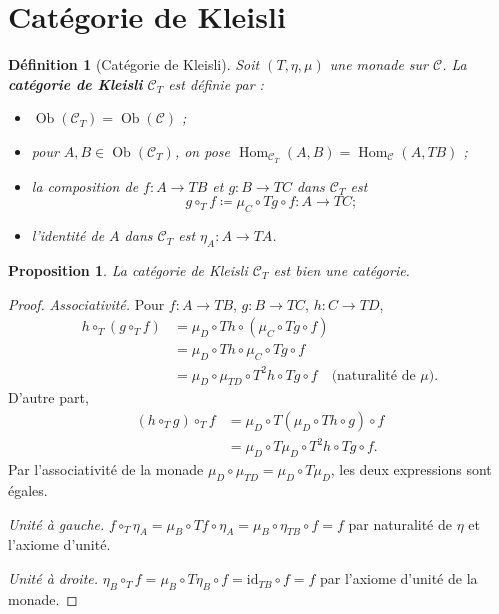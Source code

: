 \documentclass[a4paper,12pt]{book}
\DeclareMathOperator{\Hom}{Hom}
\DeclareMathOperator{\Ob}{Ob}
\newcommand{\id}{\mathrm{id}}
\newtheorem{proposition}[theoreme]{Proposition}
\newtheorem{definition}[theoreme]{Définition}
\begin{document}
\section{Catégorie de Kleisli}\label{sec:kleisli}

\begin{definition}[Catégorie de Kleisli]\label{def:categorie-kleisli}
Soit $(T, \eta, \mu)$ une monade sur $\mathcal{C}$.
La \textbf{catégorie de Kleisli} $\mathcal{C}_T$ est définie par :
\begin{itemize}
    \item $\Ob(\mathcal{C}_T) = \Ob(\mathcal{C})$ ;
    \item pour $A, B \in \Ob(\mathcal{C}_T)$, on pose
    $\Hom_{\mathcal{C}_T}(A, B) = \Hom_{\mathcal{C}}(A, TB)$ ;
    \item la composition de $f \colon A \to TB$ et $g \colon B \to TC$
    dans $\mathcal{C}_T$ est
    \[
        g \circ_T f \coloneqq \mu_C \circ Tg \circ f \colon A \to TC ;
    \]
    \item l'identité de $A$ dans $\mathcal{C}_T$ est $\eta_A \colon A \to TA$.
\end{itemize}
\end{definition}

\begin{proposition}\label{prop:kleisli-categorie}
La catégorie de Kleisli $\mathcal{C}_T$ est bien une catégorie.
\end{proposition}

\begin{proof}
\emph{Associativité.}
Pour $f \colon A \to TB$, $g \colon B \to TC$, $h \colon C \to TD$,
\begin{align*}
    h \circ_T (g \circ_T f)
    &= \mu_D \circ Th \circ (\mu_C \circ Tg \circ f) \\
    &= \mu_D \circ Th \circ \mu_C \circ Tg \circ f \\
    &= \mu_D \circ \mu_{TD} \circ T^2 h \circ Tg \circ f
    \quad \text{(naturalité de $\mu$)}.
\end{align*}
D'autre part,
\begin{align*}
    (h \circ_T g) \circ_T f
    &= \mu_D \circ T(\mu_D \circ Th \circ g) \circ f \\
    &= \mu_D \circ T\mu_D \circ T^2 h \circ Tg \circ f.
\end{align*}
Par l'associativité de la monade $\mu_D \circ \mu_{TD} = \mu_D \circ T\mu_D$,
les deux expressions sont égales.

\emph{Unité à gauche.}
$f \circ_T \eta_A = \mu_B \circ Tf \circ \eta_A
= \mu_B \circ \eta_{TB} \circ f = f$
par naturalité de $\eta$ et l'axiome d'unité.

\emph{Unité à droite.}
$\eta_B \circ_T f = \mu_B \circ T\eta_B \circ f = \id_{TB} \circ f = f$
par l'axiome d'unité de la monade.
\end{proof}
\end{document}
